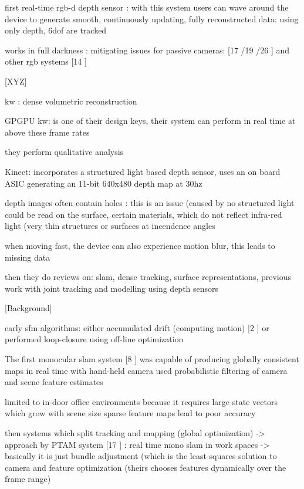 first real-time rgb-d depth sensor : with this system users can wave around the device to generate smooth, continuously updating, fully reconstructed data: using only depth, 6dof are tracked

works in full darkness : mitigating issues for passive cameras: [17 \cite{Klein07Parallel} /19 \cite{Newcombe10Live} /26 \cite{Stuhmer10Real}] and other rgb systems [14 \cite{Henry10Rgb}]

[XYZ]

kw : dense volumetric reconstruction

GPGPU kw: is one of their design keys, their system can perform in real time at above these frame rates

they perform qualitative analysis

Kinect: incorporates a structured light based depth sensor, uses an on board ASIC generating an 11-bit 640x480 depth map at 30hz

depth images often contain holes : this is an issue (caused by no structured light could be read on the surface, certain materials, which do not reflect infra-red light (very thin structures or surfaces at incendence angles

when moving fast, the device can also experience motion blur, this leads to missing data

then they do  reviews on:
	slam, dense tracking, surface representations, previous work with joint tracking and modelling using depth sensors

[Background]

early sfm algorithms: either accumulated drift (computing motion) [2 \cite{Beardsley97Sequential} ] or performed loop-closure using off-line optimization 

The first monocular slam system [8 \cite{Davison03Real} ] was capable of producing globally consistent maps in real time with hand-held camera used probabilistic filtering of camera and scene feature estimates

limited to in-door office environments because it requires large state vectors which grow with scene size
sparse feature maps lead to poor accuracy

then systems which split tracking and mapping (global optimization) -> approach by PTAM system [17 \cite{Klein07Parallel}]
: real time mono slam in work spaces -> basically it is just bundle adjustment (which is the least squares solution to camera and feature optimization (theirs chooses features dynamically over the frame range)

